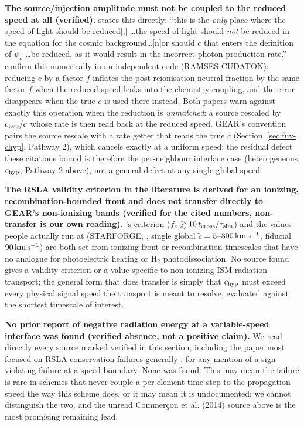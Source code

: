\textbf{The source/injection amplitude must not be coupled to the
reduced speed at all (verified).} \citet{Gnedin2026} states this
directly: ``this is the \emph{only} place where the speed of light
should be reduced[;] \dots the speed of light should \emph{not} be
reduced in the equation for the cosmic background\dots [n]or should $c$
that enters the definition of $\psi_\nu$ \dots be reduced, as it would
result in the incorrect photon production rate.'' \citet{Ocvirk2019}
confirm this numerically in an independent code (RAMSES-CUDATON):
reducing $c$ by a factor $f$ inflates the post-reionisation neutral
fraction by the same factor $f$ when the reduced speed leaks into the
chemistry coupling, and the error disappears when the true $c$ is used
there instead. Both papers warn against exactly this operation when the
reduction is \emph{unmatched}: a source rescaled by $c_{\rm hyp}/c$ whose
rate is then read back at the reduced speed. GEAR's convention pairs the
source rescale with a rate getter that reads the true $c$
(Section~\ref{sec:fuv-chyp}, Pathway 2), which cancels exactly at a uniform speed; the residual defect these citations
bound is therefore the per-neighbour interface case (heterogeneous
$c_{\rm hyp}$, Pathway 2 above), not a general defect at any single
global speed.

\textbf{The RSLA validity criterion in the literature is derived for an
ionizing, recombination-bounded front and does not transfer directly to
GEAR's non-ionizing bands (verified for the cited numbers, non-transfer
is our own reading).} \citet{Rosdahl2013}'s criterion
($f_c\gtrsim10\,t_{\rm cross}/\tau_{\rm sim}$) and the values people
actually run at (STARFORGE, \citealt{Grudic2021}, single global
$\tilde c=5$--$300\,{\rm km\,s^{-1}}$, fiducial $90\,{\rm km\,s^{-1}}$)
are both set from ionizing-front or recombination timescales that have
no analogue for photoelectric heating or H$_2$ photodissociation. No
source found gives a validity criterion or a value
specific to non-ionizing ISM radiation transport; the general form that
does transfer is simply that $c_{\rm hyp}$ must exceed every physical
signal speed the transport is meant to resolve, evaluated against the
shortest timescale of interest.

\textbf{No prior report of negative radiation energy at a variable-speed
interface was found (verified absence, not a positive claim).} We read directly every source marked verified in this section, including
the paper most focused on RSLA conservation failures generally
\citep{Gnedin2026}, for any mention of a sign-violating failure at a
speed boundary. None was found. This may mean the failure is rare in
schemes that never couple a per-element time step to the propagation
speed the way this scheme does, or it may mean it is undocumented; we
cannot distinguish the two, and the unread Commer\c{c}on et
al. (2014) source above is the most promising remaining lead.


